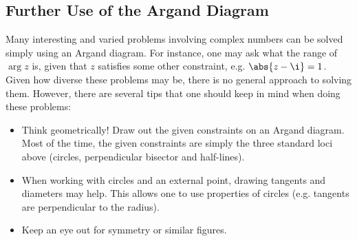 \subsection{Further Use of the Argand Diagram}

Many interesting and varied problems involving complex numbers can be solved simply using an Argand diagram. For instance, one may ask what the range of $\arg z$ is, given that $z$ satisfies some other constraint, e.g. $\abs{z - \i} = 1$. Given how diverse these problems may be, there is no general approach to solving them. However, there are several tips that one should keep in mind when doing these problems:
\begin{itemize}
    \item Think geometrically! Draw out the given constraints on an Argand diagram. Most of the time, the given constraints are simply the three standard loci above (circles, perpendicular bisector and half-lines).
    \item When working with circles and an external point, drawing tangents and diameters may help. This allows one to use properties of circles (e.g. tangents are perpendicular to the radius).
    \item Keep an eye out for symmetry or similar figures.
\end{itemize}